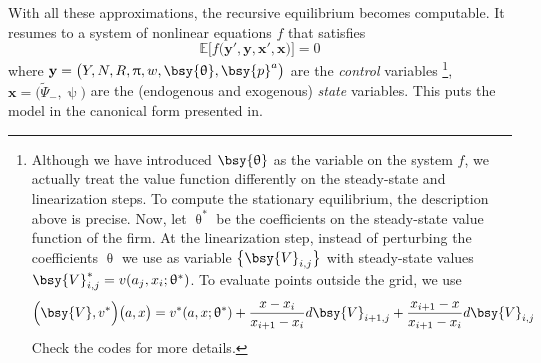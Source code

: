 \documentclass[a4paper,10pt]{article}  %
\begin{document}
With all these approximations, the recursive equilibrium becomes computable. 
It resumes to a system of nonlinear equations $ f $ that satisfies
\begin{equation}
   \label{eq:equil_conditions}
   \mathbb{E} \Big[ f \big( \mathbf{y}',\mathbf{y}, \mathbf{x}', \mathbf{x} \big) \Big] = 0
\end{equation}
where $ \textbf{y} = \big( Y,N,R,\uppi,w,\bsy{\uptheta},\bsy{p}^a \big) $ are the \emph{control} variables%
\footnote{
Although we have introduced $ \bsy{\uptheta} $ as the variable on the system $f$, we actually treat the value function
differently on the steady-state and linearization steps. To compute the stationary equilibrium, the description above is
precise. Now, let $\uptheta^*$ be the coefficients on the steady-state value function of the firm. At the linearization
step, instead of perturbing the coefficients $ \uptheta $ we use as variable $ \big\{ \bsy{V}_{i,j} \big\} $ with
steady-state values $\bsy{V}_{i,j}^* = v( a_j,x_i ;\uptheta^* ) $. To evaluate points outside the grid, we use 
\[
   \Big( \bsy{V}, v^* \Big) \big( a,x \big) = v^*( a, x; \uptheta^*) + \frac{x-x_i}{x_{i+1} - x_i}d\bsy{V}_{i+1,j}
   + \frac{x_{i+1} - x}{x_{i+1} - x_i}d\bsy{V}_{i,j}
\]
Check the codes for more details.
}, 
$ \mathbf{x} = \big(\widetilde{\Psi}_{-}, \uppsi \big) $ are the (endogenous and exogenous) \emph{state} variables.
This puts the model in the canonical form presented in. %

\end{document}
